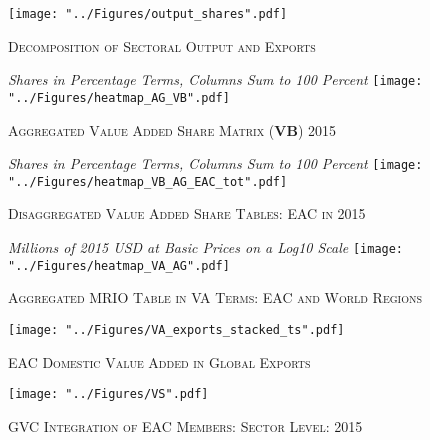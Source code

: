 \documentclass[a4paper]{article}
\begin{document}
\begin{figure}[!h]
\centering
\vspace{-2cm}
\caption{\label{fig:outshares}\textsc{Decomposition of Sectoral Output and Exports}}
\vspace*{\fill}
\begin{adjustbox}{center}
\texttt{[image: "../Figures/output\_shares".pdf]} %
\end{adjustbox}
\vspace*{\fill}
\end{figure}
\FloatBarrier

\begin{figure}[h!]
\centering
\caption{\label{fig:wldVB}\textsc{Aggregated Value Added Share Matrix (\textbf{VB}) 2015}}
\small{\textit{Shares in Percentage Terms, Columns Sum to 100 Percent}}
\texttt{[image: "../Figures/heatmap\_AG\_VB".pdf]} %
\end{figure}
\FloatBarrier

\begin{figure}[h!]
\centering
\caption{\label{fig:eacVB}\textsc{Disaggregated Value Added Share Tables: EAC in 2015}}
\small{\textit{Shares in Percentage Terms, Columns Sum to 100 Percent}}
\texttt{[image: "../Figures/heatmap\_VB\_AG\_EAC\_tot".pdf]} %
\end{figure}
\FloatBarrier

\begin{figure}[h!]
\centering
\caption{\label{fig:VAwld}\textsc{Aggregated MRIO Table in VA Terms: EAC and World Regions}}
\small{\textit{Millions of 2015 USD at Basic Prices on a Log10 Scale}}
\texttt{[image: "../Figures/heatmap\_VA\_AG".pdf]} %
\end{figure}
\FloatBarrier

\begin{figure}[h!]
\centering
\caption{\label{fig:VAexp}\textsc{EAC Domestic Value Added in Global Exports}}
\texttt{[image: "../Figures/VA\_exports\_stacked\_ts".pdf]} %
\end{figure}
\FloatBarrier

\begin{figure}[h!]
\centering
\caption{\label{fig:VS}\textsc{GVC Integration of EAC Members: Sector Level: 2015}}
\texttt{[image: "../Figures/VS".pdf]} %
\end{figure}
\FloatBarrier
\end{document}
